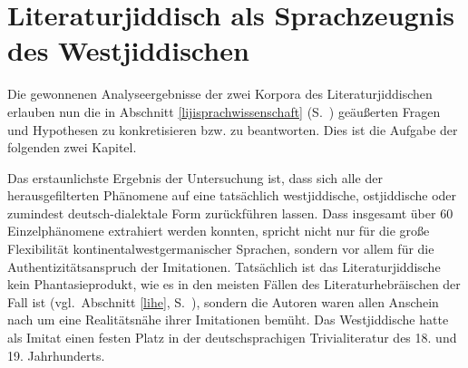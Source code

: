 \chapter{Literaturjiddisch als Sprachzeugnis des Westjiddischen}\label{sekundaerquelle}
    
Die gewonnenen Analyseergebnisse der zwei Korpora des Literaturjiddischen erlauben nun die in Abschnitt \ref{lijisprachwissenschaft} (S.\, \pageref{lijisprachwissenschaft}) geäußerten Fragen und Hypothesen zu konkretisieren bzw. zu beantworten. Dies ist die Aufgabe der folgenden zwei Kapitel.

 
Das erstaunlichste Ergebnis der Untersuchung ist, dass sich alle der herausgefilterten Phänomene auf eine tatsächlich westjiddische, ostjiddische oder zumindest deutsch-dialektale Form zurückführen lassen. Dass insgesamt über 60 Einzelphänomene extrahiert werden konnten, spricht nicht nur für die große Flexibilität kontinentalwestgermanischer Sprachen, sondern vor allem für die Authentizitätsanspruch der Imitationen. Tatsächlich ist das Literaturjiddische kein Phantasieprodukt, wie es in den meisten Fällen des Literaturhebräischen der Fall ist (vgl.\, Abschnitt \ref{lihe}, S.\, \pageref{lihe}), sondern die Autoren waren allen Anschein nach um eine Realitätsnähe ihrer Imitationen bemüht. Das Westjiddische hatte als Imitat einen festen Platz in der deutschsprachigen Trivialiteratur des 18. und 19. Jahrhunderts.
 
